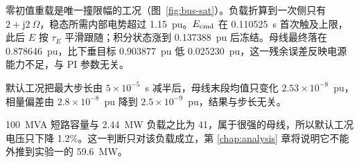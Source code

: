 零初值重载是唯一撞限幅的工况（图~\ref{fig:bus-sat}）。负载折算到一次侧只有 $2+\mathrm{j}2\ \Omega$，稳态所需内部电势超过 1.15~pu。$E_{\mathrm{cmd}}$ 在 0.110525~s 首次触及上限，此后 $E$ 按 $\tau_E$ 平滑跟随；积分状态涨到 0.137388~pu 后冻结。母线最终落在 0.878646~pu，比下垂目标 0.903877~pu 低 0.025230~pu，这一残余误差反映电源能力不足，与 PI 参数无关。

默认工况把最大步长由 $5\times10^{-5}$~s 减半后，母线末段均值只变化 $2.53\times10^{-8}$~pu，相量偏差由 $2.8\times10^{-8}$~pu 降到 $2.5\times10^{-9}$~pu，结果与步长无关。

100~MVA 短路容量与 2.44~MW 负载之比为 41，属于很强的母线，所以默认工况电压只下降 1.2\%。这一判断只对该负载成立，第 \ref{chap:analysis} 章将说明它不能外推到实验一的 59.6~MW。
